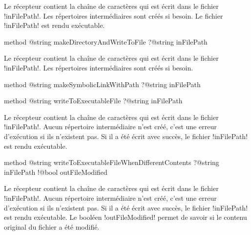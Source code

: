 Le récepteur contient la chaîne de caractères qui est écrit dans le fichier \ggst!inFilePath!. Les répertoires intermédiaires sont créés si besoin. Le fichier \ggst!inFilePath! est rendu exécutable.








\begin{galgas3box}
method @string makeDirectoryAndWriteToFile ?@string inFilePath
\end{galgas3box}

Le récepteur contient la chaîne de caractères qui est écrit dans le fichier \ggst!inFilePath!. Les répertoires intermédiaires sont créés si besoin.









\begin{galgas3box}
method @string makeSymbolicLinkWithPath ?@string inFilePath
\end{galgas3box}









\begin{galgas3box}
method @string writeToExecutableFile ?@string inFilePath
\end{galgas3box}

Le récepteur contient la chaîne de caractères qui est écrit dans le fichier \ggst!inFilePath!. Aucun répertoire intermédiaire n'est créé, c'est une erreur d'exécution si ils n'existent pas. Si il a été écrit avec succès, le fichier \ggst!inFilePath! est rendu exécutable.










\begin{galgas3box}
method @string writeToExecutableFileWhenDifferentContents
    ?@string inFilePath
    !@bool outFileModified
\end{galgas3box}

Le récepteur contient la chaîne de caractères qui est écrit dans le fichier \ggst!inFilePath!. Aucun répertoire intermédiaire n'est créé, c'est une erreur d'exécution si ils n'existent pas. Si il a été écrit avec succès, le fichier \ggst!inFilePath! est rendu exécutable. Le booléen \ggst!outFileModified! permet de savoir si le contenu original du fichier a été modifié.










